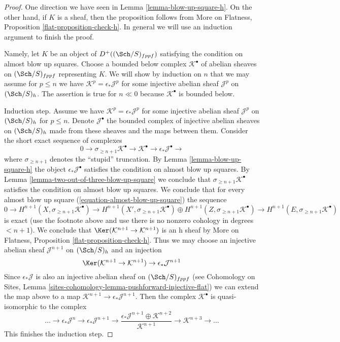 \begin{proof}
One direction we have seen in Lemma \ref{lemma-blow-up-square-h}.
On the other hand, if $K$ is a sheaf, then the proposition follows from
More on Flatness, Proposition \ref{flat-proposition-check-h}.
In general we will use an induction argument to finish the proof.

\medskip\noindent
Namely, let $K$ be an object of $D^+((\Sch/S)_{fppf})$ satisfying
the condition on almost blow up squares.
Choose a bounded below complex $\mathcal{K}^\bullet$ of
abelian sheaves on $(\Sch/S)_{fppf}$ representing $K$.
We will show by induction on $n$ that we may assume for $p \leq n$ we
have $\mathcal{K}^p = \epsilon_*\mathcal{J}^p$ for some
injective abelian sheaf $\mathcal{J}^p$ on $(\Sch/S)_h$.
The assertion is true for $n \ll 0$ because $\mathcal{K}^\bullet$
is bounded below.

\medskip\noindent
Induction step. Assume we have $\mathcal{K}^p = \epsilon_*\mathcal{J}^p$
for some injective abelian sheaf $\mathcal{J}^p$ on $(\Sch/S)_h$
for $p \leq n$. Denote $\mathcal{J}^\bullet$ the bounded complex
of injective abelian sheaves on $(\Sch/S)_h$ made from these sheaves
and the maps between them. Consider the short exact sequence of complexes
$$
0 \to \sigma_{\geq n + 1}\mathcal{K}^\bullet \to
\mathcal{K}^\bullet \to \epsilon_*\mathcal{J}^\bullet \to
$$
where $\sigma_{\geq n + 1}$ denotes the ``stupid'' truncation.
By Lemma \ref{lemma-blow-up-square-h} the object
$\epsilon_*\mathcal{J}^\bullet$ satisfies the condition on
almost blow up squares.
By Lemma \ref{lemma-two-out-of-three-blow-up-square}
we conclude that $\sigma_{\geq n + 1}\mathcal{K}^\bullet$
satisfies the condition on almost blow up squares.
We conclude that for every almost blow up square
(\ref{equation-almost-blow-up-square})
the sequence
$$
0 \to H^{n + 1}(X, \sigma_{\geq n + 1}\mathcal{K}^\bullet) \to
H^{n + 1}(X', \sigma_{\geq n + 1}\mathcal{K}^\bullet) \oplus
H^{n + 1}(Z, \sigma_{\geq n + 1}\mathcal{K}^\bullet) \to
H^{n + 1}(E, \sigma_{\geq n + 1}\mathcal{K}^\bullet)
$$
is exact (use the footnote above and use
there is no nonzero cohology in degrees $< n + 1$).
We conclude that
$\Ker(\mathcal{K}^{n + 1} \to \mathcal{K}^{n + 1})$
is an h sheaf by
More on Flatness, Proposition \ref{flat-proposition-check-h}.
Thus we may choose an injective abelian sheaf
$\mathcal{J}^{n + 1}$ on $(\Sch/S)_h$ and an injection
$$
\Ker(\mathcal{K}^{n + 1} \to \mathcal{K}^{n + 1})
\to \epsilon_*\mathcal{J}^{n + 1}
$$
Since $\epsilon_*\mathcal{J}$ is also an injective abelian
sheaf on $(\Sch/S)_{fppf}$
(see Cohomology on Sites, Lemma
\ref{sites-cohomology-lemma-pushforward-injective-flat})
we can extend the map above to a map
$\mathcal{K}^{n + 1} \to \epsilon_*\mathcal{J}^{n + 1}$.
Then the complex $\mathcal{K}^\bullet$ is quasi-isomorphic to the complex
$$
\ldots \to
\epsilon_*\mathcal{J}^n \to
\epsilon_*\mathcal{J}^{n + 1} \to
\frac{\epsilon_*\mathcal{J}^{n + 1} \oplus \mathcal{K}^{n + 2}}{\mathcal{K}^{n + 1}}
\to
\mathcal{K}^{n + 3} \to \ldots
$$
This finishes the induction step.


\end{proof}
